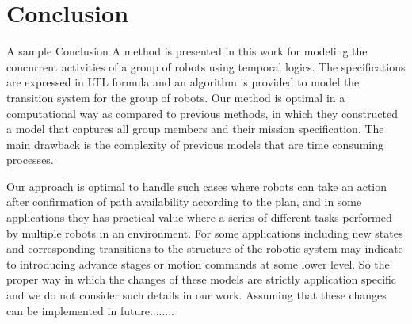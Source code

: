 \pagebreak
\section{Conclusion}
A sample Conclusion 
A method is presented in this work for modeling the concurrent activities of a group of robots using temporal logics. The specifications are expressed in LTL formula and an algorithm is provided to model the transition system for the group of robots. Our method is optimal in a computational way as compared to previous methods, in which they constructed a model that captures all group members and their mission specification. The main drawback is the complexity of previous models that are time consuming processes.

Our approach is optimal to handle such cases where robots can take an action after confirmation of path availability according to the plan, and in some applications they has practical value where a series of different tasks performed by multiple robots in an environment. For some applications including new states and corresponding transitions to the structure of the robotic system may indicate to introducing advance stages or motion commands at some lower level. So the proper way in which the changes of these models are strictly application specific and we do not consider such details in our work. Assuming that these changes can be implemented in future........


